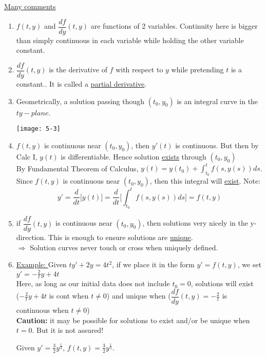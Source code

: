 {\Large \underline{Many comments}}
\begin{enumerate}[label=\protect\circled{\alph*}]
	\item $f(t,y)$ and $\dfrac{df}{dy}(t,y)$ are functions of 2 variables. Continuity here is bigger than simply continuous in each variable while holding the other variable constant.
	\item $\dfrac{df}{dy}(t,y)$ is the derivative of $f$ with respect to $y$ while pretending $t$ is a constant.. It is called a \underline{partial derivative}.
	\item Geometrically, a solution passing though $(t_0, y_0)$ is an integral curve in the $ty-plane$.\\
	\begin{center}
		\texttt{[image: 5-3]}		
	\end{center}
	\item $f(t,y)$ is continuous near $(t_0, y_0)$, then $y'(t)$ is continuous. But then by Calc I, $y(t)$ is differentiable. Hence solution \underline{exists} through $(t_0, y_0)$\\
	By Fundamental Theorem of Calculus, $y(t) = y(t_0) + \int_{t_0}^t f(s, y(s)) ds $.\\
	Since  $f(t,y)$ is continuous near $(t_0, y_0)$, then this integral will \underline{exist}. Note:
	\begin{equation*}
		y' = \dfrac{d}{dt}\bigg[y(t)\bigg] = \dfrac{d}{dt}\bigg[\int_{t_0}^t f(s, y(s)) ds\bigg] = f(t,y)
	\end{equation*}
	\item if $\dfrac{df}{dy}(t, y)$ is continuous near $(t_0, y_0)$, then solutions very nicely in the y-direction. This is enough to ensure solutions are \underline{unique}.\\
	$\Rightarrow$ Solution curves never touch or cross when uniquely defined. 
	\item \underline{Example: } Given $ty' + 2y = 4t^2$, if we place it in the form $y' = f(t,y)$, we set $y' = -\frac{2}{t}y + 4t$\\
	Here, as long as our initial data does not include $t_0 = 0$, solutions will exist\\ ($-\frac{2}{t}y + 4t$ is cont when $t\neq 0$) and unique when ($\dfrac{df}{dy}(t,y) = -\frac{2}{t}$ is continuous when $t \neq 0$)\\
	\textbf{Caution: } it may be possible for solutions to exist and/or be unique when $t=0$. But it is not assured!
	\begin{example-N}
		Given $y' = \frac{3}{2} y^{\frac{1}{3}}$, $f(t,y) = \frac{3}{2} y^{\frac{1}{3}}$.\\

\end{example-N}
\end{enumerate}
